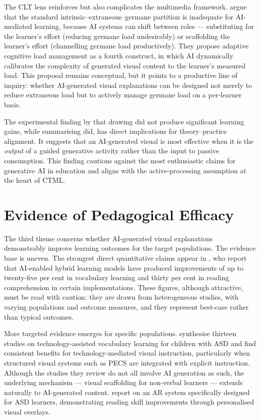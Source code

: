 The CLT lens reinforces but also complicates the multimedia framework. \citet{twabu2025} argue that the standard intrinsic--extraneous--germane partition is inadequate for AI-mediated learning, because AI systems can shift between roles --- substituting for the learner's effort (reducing germane load undesirably) or scaffolding the learner's effort (channelling germane load productively). They propose adaptive cognitive load management as a fourth construct, in which AI dynamically calibrates the complexity of generated visual content to the learner's measured load. This proposal remains conceptual, but it points to a productive line of inquiry: whether AI-generated visual explanations can be designed not merely to reduce extraneous load but to actively manage germane load on a per-learner basis.

The experimental finding by \citet{lawson2024} that drawing did not produce significant learning gains, while summarising did, has direct implications for theory--practice alignment. It suggests that an AI-generated visual is most effective when it is the \emph{output} of a guided generative activity rather than the input to passive consumption. This finding cautions against the most enthusiastic claims for generative AI in education and aligns with the active-processing assumption at the heart of CTML.

\section{Evidence of Pedagogical Efficacy}

The third theme concerns whether AI-generated visual explanations demonstrably improve learning outcomes for the target populations. The evidence base is uneven. The strongest direct quantitative claims appear in \citet{ahmad2025}, who report that AI-enabled hybrid learning models have produced improvements of up to twenty-five per cent in vocabulary learning and thirty per cent in reading comprehension in certain implementations. These figures, although attractive, must be read with caution: they are drawn from heterogeneous studies, with varying populations and outcome measures, and they represent best-case rather than typical outcomes.

More targeted evidence emerges for specific populations. \citet{urrea2024} synthesise thirteen studies on technology-assisted vocabulary learning for children with ASD and find consistent benefits for technology-mediated visual instruction, particularly when structured visual systems such as PECS are integrated with explicit instruction. Although the studies they review do not all involve AI generation as such, the underlying mechanism --- visual scaffolding for non-verbal learners --- extends naturally to AI-generated content. \citet{khoirunnisa2024} report on an AR system specifically designed for ASD learners, demonstrating reading skill improvements through personalised visual overlays.

